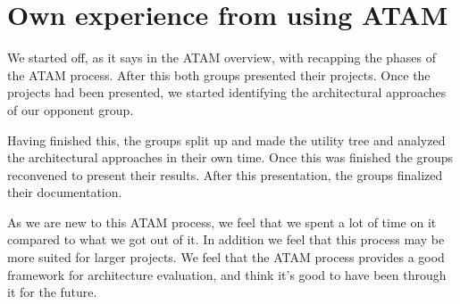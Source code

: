 \section{Own experience from using ATAM}

We started off, as it says in the ATAM overview, with recapping the phases of
the ATAM process. After this both groups presented their projects. Once the
projects had been presented, we started identifying the architectural
approaches of our opponent group.

Having finished this, the groups split up and made the utility tree and
analyzed the architectural approaches in their own time. Once this was finished
the groups reconvened to present their results. After this presentation, the
groups finalized their documentation.

As we are new to this ATAM process, we feel that we spent a lot of time on it
compared to what we got out of it. In addition we feel that this process may
be more suited for larger projects. We feel that the ATAM process provides a
good framework for architecture evaluation, and think it's good to have been
through it for the future.
